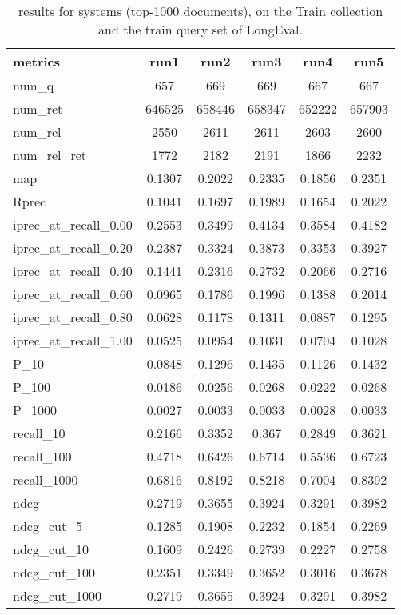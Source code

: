 \begin{table}[h!]
    \centering
    \begin{tabular}{ |l|c|c|c|c|c| }
        \hline
        metrics & run1 & run2 & run3 & run4 & run5 \\ \hline
        num\_q & 657 & 669 & 669 & 667 & 667 \\ \hline
        num\_ret & 646525 & 658446 & 658347 & 652222 & 657903 \\ \hline
        num\_rel & 2550 & 2611 & 2611 & 2603 & 2600 \\ \hline
        num\_rel\_ret & 1772 & 2182 & 2191 & 1866 & 2232 \\ \hline
        map & 0.1307 & 0.2022 & 0.2335 & 0.1856 & 0.2351 \\ \hline
        Rprec & 0.1041 & 0.1697 & 0.1989 & 0.1654 & 0.2022 \\ \hline
        iprec\_at\_recall\_0.00 & 0.2553 & 0.3499 & 0.4134 & 0.3584 & 0.4182 \\ \hline
        iprec\_at\_recall\_0.20 & 0.2387 & 0.3324 & 0.3873 & 0.3353 & 0.3927 \\ \hline
        iprec\_at\_recall\_0.40 & 0.1441 & 0.2316 & 0.2732 & 0.2066 & 0.2716 \\ \hline
        iprec\_at\_recall\_0.60 & 0.0965 & 0.1786 & 0.1996 & 0.1388 & 0.2014 \\ \hline
        iprec\_at\_recall\_0.80 & 0.0628 & 0.1178 & 0.1311 & 0.0887 & 0.1295 \\ \hline
        iprec\_at\_recall\_1.00 & 0.0525 & 0.0954 & 0.1031 & 0.0704 & 0.1028 \\ \hline
        P\_10 & 0.0848 & 0.1296 & 0.1435 & 0.1126 & 0.1432 \\ \hline
        P\_100 & 0.0186 & 0.0256 & 0.0268 & 0.0222 & 0.0268 \\ \hline
        P\_1000 & 0.0027 & 0.0033 & 0.0033 & 0.0028 & 0.0033 \\ \hline
        recall\_10 & 0.2166 & 0.3352 & 0.367 & 0.2849 & 0.3621 \\ \hline
        recall\_100 & 0.4718 & 0.6426 & 0.6714 & 0.5536 & 0.6723 \\ \hline
        recall\_1000 & 0.6816 & 0.8192 & 0.8218 & 0.7004 & 0.8392 \\ \hline
        ndcg & 0.2719 & 0.3655 & 0.3924 & 0.3291 & 0.3982 \\ \hline
        ndcg\_cut\_5 & 0.1285 & 0.1908 & 0.2232 & 0.1854 & 0.2269 \\ \hline
        ndcg\_cut\_10 & 0.1609 & 0.2426 & 0.2739 & 0.2227 & 0.2758 \\ \hline
        ndcg\_cut\_100 & 0.2351 & 0.3349 & 0.3652 & 0.3016 & 0.3678 \\ \hline
        ndcg\_cut\_1000 & 0.2719 & 0.3655 & 0.3924 & 0.3291 & 0.3982 \\ \hline
    \end{tabular}
    \caption{results for systems (top-1000 documents), on the Train collection and the train query set of LongEval.}
    \label{table:results}
\end{table}

